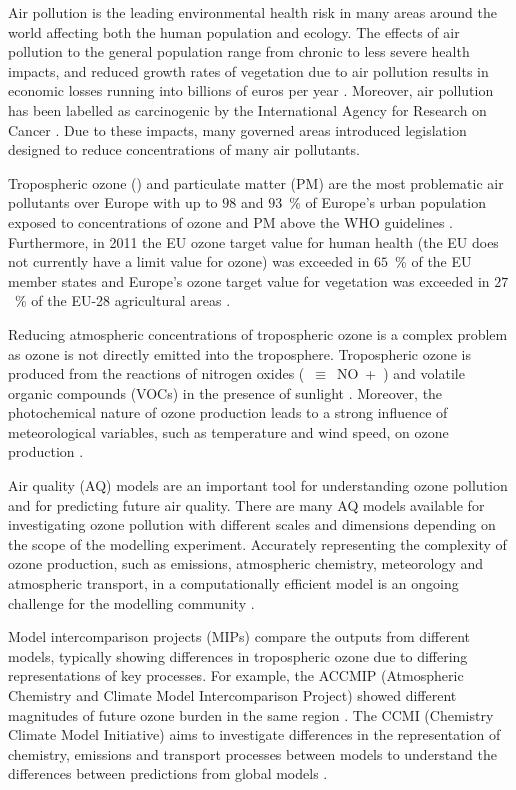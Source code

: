 Air pollution is the leading environmental health risk in many areas around the world affecting both the human population and ecology.
The effects of air pollution to the general population range from chronic to less severe health impacts, and reduced growth rates of vegetation due to air pollution results in economic losses running into billions of euros per year \citep{AQEU:2015}.
Moreover, air pollution has been labelled as carcinogenic by the International Agency for Research on Cancer \citep{IARC:2013}.
Due to these impacts, many governed areas introduced legislation designed to reduce concentrations of many air pollutants.

Tropospheric ozone () and particulate matter (PM) are the most problematic air pollutants over Europe with up to $98$ and $93$~\% of Europe's urban population exposed to concentrations of ozone and PM above the WHO guidelines \citep{AQEU:2015}.
Furthermore, in 2011 the EU ozone target value for human health (the EU does not currently have a  limit value for ozone) was exceeded in $65$~\% of the EU member states and Europe's ozone target value for vegetation was exceeded in $27$~\% of the EU-28 agricultural areas \citep{AQEU:2013}.

Reducing atmospheric concentrations of tropospheric ozone is a complex problem as ozone is not directly emitted into the troposphere.
Tropospheric ozone is produced from the reactions of nitrogen oxides \mbox{(~$\equiv$~NO + )} and volatile organic compounds (VOCs) in the presence of sunlight \citep{Atkinson:2000}.
Moreover, the photochemical nature of ozone production leads to a strong influence of meteorological variables, such as temperature and wind speed, on ozone production \citep{Jacob:2009}.

Air quality (AQ) models are an important tool for understanding ozone pollution and for predicting future air quality.
There are many AQ models available for investigating ozone pollution with different scales and dimensions depending on the scope of the modelling experiment.
Accurately representing the complexity of ozone production, such as emissions, atmospheric chemistry, meteorology and atmospheric transport, in a computationally efficient model is an ongoing challenge for the modelling community \citep{Russell:2000}.

Model intercomparison projects (MIPs) compare the outputs from different models, typically showing differences in tropospheric ozone due to differing representations of key processes.
For example, the ACCMIP (Atmospheric Chemistry and Climate Model Intercomparison Project) showed different magnitudes of future ozone burden in the same region \citep{Young:2013}.
The CCMI (Chemistry Climate Model Initiative) aims to investigate differences in the representation of chemistry, emissions and transport processes between models to understand the differences between predictions from global models \citep{Eyring:2013}.

